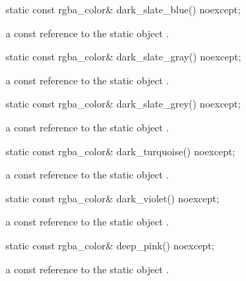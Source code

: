 \begin{itemdecl}
static const rgba_color& dark_slate_blue() noexcept;
\end{itemdecl}
\begin{itemdescr}
\pnum
\returns
a const reference to the static  object .
\end{itemdescr}

\begin{itemdecl}
static const rgba_color& dark_slate_gray() noexcept;
\end{itemdecl}
\begin{itemdescr}
\pnum
\returns
a const reference to the static  object .
\end{itemdescr}

\begin{itemdecl}
static const rgba_color& dark_slate_grey() noexcept;
\end{itemdecl}
\begin{itemdescr}
\pnum
\returns
a const reference to the static  object .
\end{itemdescr}

\begin{itemdecl}
static const rgba_color& dark_turquoise() noexcept;
\end{itemdecl}
\begin{itemdescr}
\pnum
\returns
a const reference to the static  object .
\end{itemdescr}

\begin{itemdecl}
static const rgba_color& dark_violet() noexcept;
\end{itemdecl}
\begin{itemdescr}
\pnum
\returns
a const reference to the static  object .
\end{itemdescr}

\begin{itemdecl}
static const rgba_color& deep_pink() noexcept;
\end{itemdecl}
\begin{itemdescr}
\pnum
\returns
a const reference to the static  object .
\end{itemdescr}

